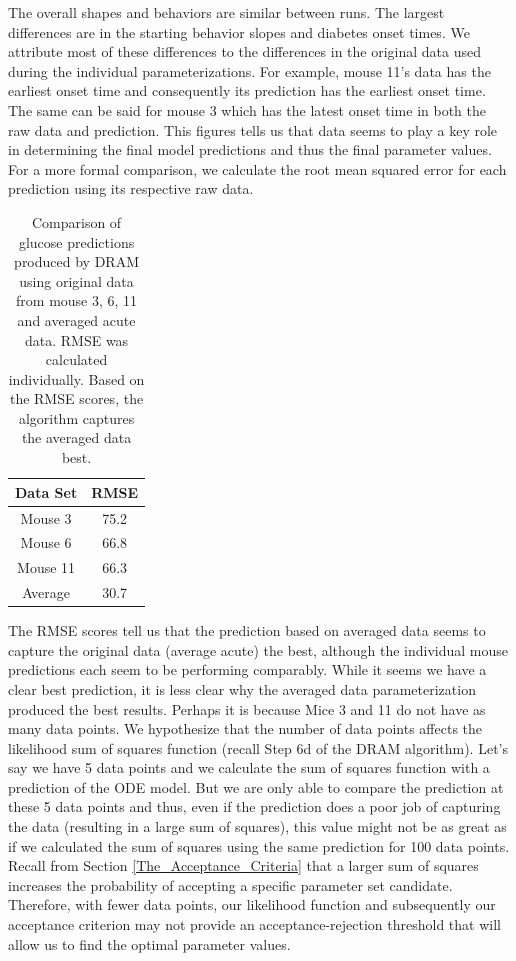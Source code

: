 The overall shapes and behaviors are similar between runs. The largest differences are in the starting behavior slopes and diabetes onset times. We attribute most of these differences to the differences in the original data used during the individual parameterizations. For example, mouse 11's data has the earliest onset time and consequently its prediction has the earliest onset time. The same can be said for mouse 3 which has the latest onset time in both the raw data and prediction. This figures tells us that data seems to play a key role in determining the final model predictions and thus the final parameter values. For a more formal comparison, we calculate the root mean squared error for each prediction using its respective raw data.
\begin{table}[H]
\centering
        \begin{tabular}{c | c}
            \cline{1-2}
            \textbf{Data Set}  &\textbf{RMSE}\\
            \hline
            Mouse 3 & 75.2\\
            Mouse 6 & 66.8\\
            Mouse 11 & 66.3\\
            Average & 30.7
             \\\hline
            \hline
        \end{tabular}
    \caption{Comparison of glucose predictions produced by DRAM using original data from mouse 3, 6, 11 and averaged acute data. RMSE was calculated individually. Based on the RMSE scores, the algorithm captures the averaged data best.}
    \label{tab:7mcmc} 
\end{table}
The RMSE scores tell us that the prediction based on averaged data seems to capture the original data (average acute) the best, although the individual mouse predictions each seem to be performing comparably. While it seems we have a clear best prediction, it is less clear why the averaged data parameterization produced the best results. Perhaps it is because Mice 3 and 11 do not have as many data points. We hypothesize that the number of data points affects the likelihood sum of squares function (recall Step 6d of the DRAM algorithm). Let's say we have 5 data points and we calculate the sum of squares function with a prediction of the ODE model. But we are only able to compare the prediction at these 5 data points and thus, even if the prediction does a poor job of capturing the data (resulting in a large sum of squares), this value might not be as great as if we calculated the sum of squares using the same prediction for 100 data points. Recall from Section \ref{The_Acceptance_Criteria} that a larger sum of squares increases the probability of accepting a specific parameter set candidate. Therefore, with fewer data points, our likelihood function and subsequently our acceptance criterion may not provide an acceptance-rejection threshold that will allow us to find the optimal parameter values.
